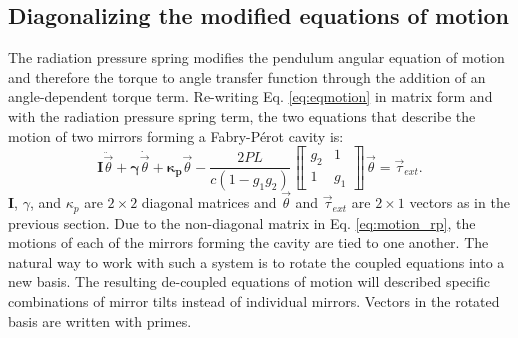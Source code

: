 \subsection{Diagonalizing the modified equations of motion}
\label{sec:eigenbasis}
The radiation pressure spring modifies the pendulum angular equation
of motion and therefore the torque to angle transfer function
through the addition of an angle-dependent torque term. Re-writing
Eq. \ref{eq:eqmotion} in matrix form and with the radiation pressure
spring term, the two equations that describe the motion of two mirrors
forming a Fabry-P\'{e}rot cavity is: 
\begin{equation}
\mathbf{I} \ddot{\vec{\theta}} 
+ {\bm \gamma} \dot{\vec{\theta}} 
+ \mathbf{\kappa_p} \vec{\theta}
- \frac{2 P L}{c (1-g_1 g_2)}
\left\llbracket \begin{array}{cc}
g_2 & 1\\
1 & g_1\end{array} \right\rrbracket \vec{\theta} 
= \vec{\tau}_{ext}.
\label{eq:motion_rp}
\end{equation}
$\mathbf{I}$, $\gamma$, and $\kappa_p$ are $2 \times 2$ diagonal
matrices and $\vec{\theta}$ and $\vec{\tau}_{ext}$ are $2 \times 1$
vectors as in the previous section. Due to the non-diagonal matrix in
Eq. \ref{eq:motion_rp}, the motions of each of the mirrors forming the
cavity are tied to one another. The natural way to work with such a
system is to rotate the coupled equations into a new basis. The
resulting de-coupled equations of motion will described specific
combinations of mirror tilts instead of individual mirrors. Vectors in
the rotated basis are written with primes.

